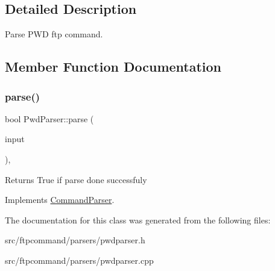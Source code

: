 \subsection{Detailed Description}
Parse P\+WD ftp command. 

\subsection{Member Function Documentation}
\mbox{\label{classPwdParser_a2eb9149ae412e0d3a1b4b8f70f037224}} 
\subsubsection{\texorpdfstring{parse()}{parse()}}
{\footnotesize\ttfamily bool Pwd\+Parser\+::parse (\begin{DoxyParamCaption}\item[{const Q\+String \&}]{input }\end{DoxyParamCaption})\hspace{0.3cm}{\ttfamily [override]}, {\ttfamily [virtual]}}

\begin{DoxyReturn}{Returns}
True if parse done successfuly 
\end{DoxyReturn}


Implements \hyperlink{classCommandParser_a5ed0855947a9b4500329f29b8123f2ea}{Command\+Parser}.



The documentation for this class was generated from the following files\+:\begin{DoxyCompactItemize}
\item 
src/ftpcommand/parsers/pwdparser.\+h\item 
src/ftpcommand/parsers/pwdparser.\+cpp\end{DoxyCompactItemize}
